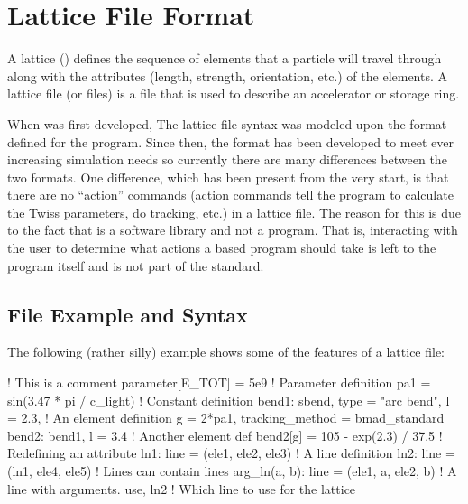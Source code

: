 \chapter{Lattice File Format}
\label{c:lat.file}

A lattice () defines the sequence of elements that a particle will travel
through along with the attributes (length, strength, orientation, etc.) of the elements.  A lattice
file (or files) is a file that is used to describe an accelerator or storage ring.

When \bmad was first developed, The \bmad lattice file syntax was modeled upon the format defined
for the \mad program\cite{b:maduser}. Since then, the \bmad format has been developed to meet ever
increasing simulation needs so currently there are many differences between the two formats. One
difference, which has been present from the very start, is that there are no ``action'' commands
(action commands tell the program to calculate the Twiss parameters, do tracking, etc.) in a \bmad
lattice file. The reason for this is due to the fact that \bmad is a software library and not a
program. That is, interacting with the user to determine what actions a \bmad based program should
take is left to the program itself and is not part of the \bmad standard.

\section{File Example and Syntax}

The following (rather silly) example shows some of the features of a
\bmad lattice file:
\begin{example}
  ! This is a comment
  parameter[E_TOT] = 5e9                   ! Parameter definition
  pa1 = sin(3.47 * pi / c_light)                 ! Constant definition
  bend1: sbend, type = "arc bend", l = 2.3,      ! An element definition
      g = 2*pa1, tracking_method = bmad_standard
  bend2: bend1, l = 3.4                          ! Another element def
  bend2[g] = 105 - exp(2.3) / 37.5               ! Redefining an attribute
  ln1: line = (ele1, ele2, ele3)                 ! A line definition
  ln2: line = (ln1, ele4, ele5)                  ! Lines can contain lines
  arg_ln(a, b): line = (ele1, a, ele2, b)        ! A line with arguments.
  use, ln2                                       ! Which line to use for the lattice
\end{example}


